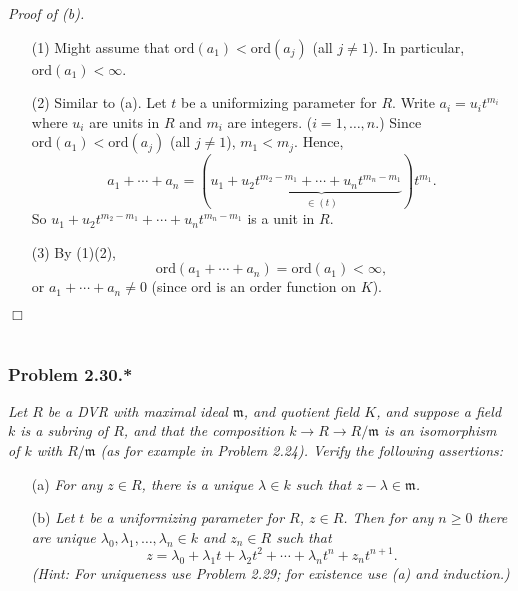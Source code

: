 \documentclass{article}
\begin{document}
\emph{Proof of (b).}
\begin{enumerate}
\item[(1)]
  Might assume that $\mathrm{ord}(a_1) < \mathrm{ord}(a_j)$ (all $j \neq 1$).
  In particular, $\mathrm{ord}(a_1) < \infty$.

\item[(2)]
  Similar to (a).
  Let $t$ be a uniformizing parameter for $R$.
  Write $a_i = u_i t^{m_i}$ where $u_i$ are units in $R$ and $m_i$ are integers.
  ($i = 1, \ldots, n$.)
  Since $\mathrm{ord}(a_1) < \mathrm{ord}(a_j)$ (all $j \neq 1$), $m_1 < m_j$.
  Hence,
  \[
    a_1 + \cdots + a_n
    = (u_1
      + \underbrace{u_2 t^{m_2 - m_1} + \cdots + u_n t^{m_n - m_1}}_{\in (t)}) t^{m_1}.
  \]
  So $u_1 + u_2 t^{m_2 - m_1} + \cdots + u_n t^{m_n - m_1}$ is a unit in $R$.

\item[(3)]
  By (1)(2),
  \[
    \mathrm{ord}(a_1 + \cdots + a_n) = \mathrm{ord}(a_1) < \infty,
  \]
  or $a_1 + \cdots + a_n \neq 0$
  (since $\mathrm{ord}$ is an order function on $K$).
\end{enumerate}
$\Box$ \\\\






\subsubsection*{Problem 2.30.*}
\emph{Let $R$ be a DVR with maximal ideal $\mathfrak{m}$, and quotient field $K$,
and suppose a field $k$ is a subring of $R$,
and that the composition $k \to R \to R/\mathfrak{m}$ is an isomorphism of $k$ with $R/\mathfrak{m}$
(as for example in Problem 2.24).
Verify the following assertions:}
\begin{enumerate}
\item[(a)]
  \emph{For any $z \in R$, there is a unique $\lambda \in k$ such that
  $z - \lambda \in \mathfrak{m}$.}

\item[(b)]
  \emph{Let $t$ be a uniformizing parameter for $R$, $z \in R$.
  Then for any $n \geq 0$
  there are unique $\lambda_0,\lambda_1,\ldots,\lambda_n \in k$ and $z_n \in R$ such that
  \[
    z = \lambda_0 + \lambda_1 t + \lambda_2 t^2 + \cdots + \lambda_n t^n + z_n t^{n+1}.
  \]
  (Hint: For uniqueness use Problem 2.29; for existence use (a) and induction.)} \\
\end{enumerate}
\end{document}
